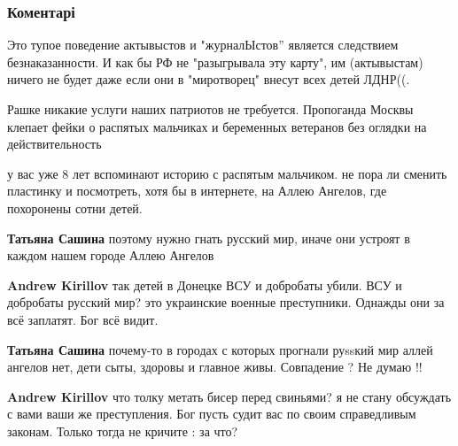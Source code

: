  
 
 
 
 
\subsubsection{Коментарі}
\label{sec:13_10_2021.fb.zharkih_denis.4.savenkova_prodolzhenie.cmt}

\begin{itemize} %

Это тупое поведение актывыстов и "журналЫстов'' является следствием
безнаказанности. И как бы РФ не "разыгрывала эту карту", им (актывыстам) ничего
не будет даже если они в "миротворец" внесут всех детей ЛДНР((.


Рашке никакие услуги наших патриотов не требуется. Пропоганда Москвы клепает
фейки о распятых мальчиках и беременных ветеранов без оглядки на
действительность

\begin{itemize} %

у вас уже 8 лет вспоминают историю с распятым мальчиком. не пора ли сменить
пластинку и посмотреть, хотя бы в интернете, на Аллею Ангелов, где похоронены
сотни детей.

\textbf{Татьяна Сашина} поэтому нужно гнать русский мир, иначе они устроят в каждом нашем городе Аллею Ангелов

\textbf{Andrew Kirillov} так детей в Донецке ВСУ и добробаты убили. ВСУ и добробаты русский мир? это украинские военные преступники. Однажды они за всё заплатят. Бог всё видит.

\textbf{Татьяна Сашина} почему-то в городах с которых прогнали руssкий мир аллей ангелов нет, дети сыты, здоровы и главное живы. Совпадение ? Не думаю !!

\textbf{Andrew Kirillov} что толку метать бисер перед свиньями? я не стану обсуждать с вами ваши же преступления. Бог пусть судит вас по своим справедливым законам. Только тогда не кричите : за что?


\end{itemize}
\end{itemize}
